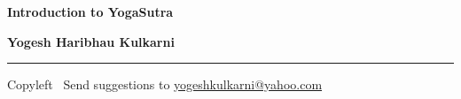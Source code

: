 
\usepackage{polyglossia}
\setdefaultlanguage{sanskrit}

\usepackage{fontspec}
\setmainfont{Segoe UI}

\newfontfamily{}
\newfontfamily{}
\newfontfamily{}
\newfontfamily{}


\graphicspath{{images/}}



\footnotesize


\begin{center}
\Large{\textbf{Introduction to YogaSutra}}  

\small{\textbf{Yogesh Haribhau Kulkarni}}  
\end{center}

\begin{multicols}{2}

\end{multicols}

\rule{\linewidth}{0.25pt}
\scriptsize
Copyleft \textcopyleft\  Send suggestions to 
\href{http://www.yogeshkulkarni.com}{yogeshkulkarni@yahoo.com}


